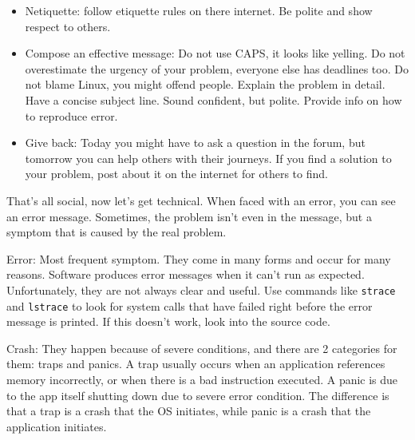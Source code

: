 \documentclass[11pt]{article}
\begin{document}
\begin{enumerate}
\begin{enumerate}
\begin{itemize}
            \item Netiquette: follow etiquette rules on there internet. Be polite and show respect to others. 
            \item Compose an effective message: Do not use CAPS, it looks like yelling. Do not overestimate the urgency of your problem, everyone else has deadlines too. Do not blame Linux, you might offend people. Explain the problem in detail. Have a concise subject line. Sound confident, but polite. Provide info on how to reproduce error.
            \item Give back: Today you might have to ask a question in the forum, but tomorrow you can help others with their journeys. If you find a solution to your problem, post about it on the internet for others to find.
        \end{itemize}
\end{enumerate}

\noindent That's all social, now let's get technical. When faced with an error, you can see an error message. Sometimes, the problem isn't even in the message, but a symptom that is caused by the real problem. 

\noindent Error: Most frequent symptom. They come in many forms and occur for many reasons. Software produces error messages when it can't run as expected. Unfortunately, they are not always clear and useful. Use commands like \texttt{strace} and \texttt{lstrace} to look for system calls that have failed right before the error message is printed. If this doesn't work, look into the source code.

\noindent Crash: They happen because of severe conditions, and there are 2 categories for them: traps and panics. A trap usually occurs when an application references memory incorrectly, or when there is a bad instruction executed. A panic is due to the app itself shutting down due to severe error condition. The difference is that a trap is a crash that the OS initiates, while panic is a crash that the application initiates.


\end{enumerate}
\end{document}
